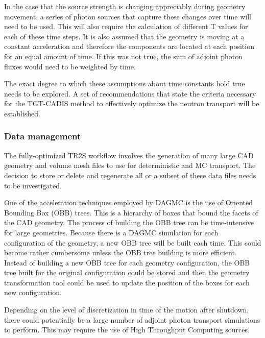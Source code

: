 In the case that the source strength is changing appreciably during geometry
movement, a  series of photon sources that capture these changes over time
will need to be used.  This will also require the calculation of different T
values for each of these time steps.
It is also assumed that the geometry is moving at a constant acceleration
and therefore the components are located at each position for an equal amount of time.  If
this was not true, the sum of adjoint photon fluxes would need to be weighted
by time. 

The exact degree to which these assumptions about time constants hold true
needs to be explored. A set of recommendations %
that state the criteria 
necessary for the TGT-CADIS method to effectively optimize the neutron
transport  will
be established.

\subsubsection{Data management}
The fully-optimized TR2S workflow involves the generation of many large
CAD geometry and volume mesh files to use for deterministic and MC transport.
The decision to store or delete and regenerate all or a subset of these data files needs to
be investigated.

One of the acceleration techniques employed by DAGMC is the use of Oriented
Bounding Box (OBB) trees.  This is a hierarchy of boxes that bound the facets 
of the CAD geometry.  The process of building the OBB tree can be
time-intensive for large geometries.  Because there is a DAGMC simulation for
each configuration of the geometry, a new OBB tree will be built each time.  This could
become rather cumbersome unless the OBB tree building is more efficient.
Instead of building a new OBB tree for each geometry configuration, the OBB
tree built for the original configuration could be stored and then the geometry
transformation tool could be used to update the position of the boxes for each 
new configuration.

Depending on the level of discretization in time of the motion after shutdown,
there could potentially be a large number of adjoint photon transport
simulations to perform.  This may require the use of High Throughput Computing
sources.

